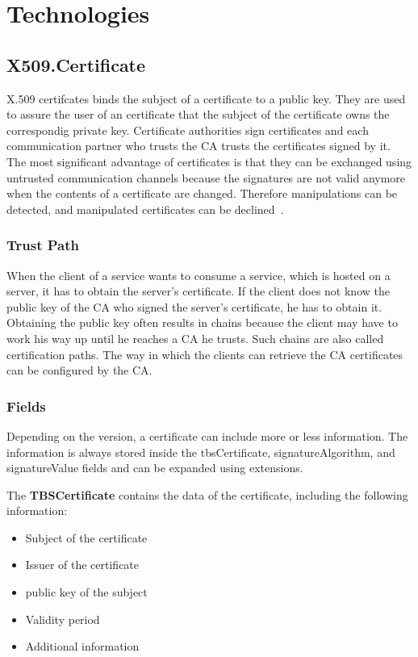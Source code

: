 \section{Technologies}
\subsection{X509.Certificate}
X.509 certifcates binds the subject of a certificate to a public key.
They are used to assure the user of an certificate that the subject of the certificate owns the correspondig private key.
Certificate authorities sign certificates and each communication partner who trusts the CA trusts the certificates signed by it.
The most significant advantage of certificates is that they can be exchanged using untrusted communication channels because the signatures are not valid anymore when the contents of a certificate are changed.
Therefore manipulations can be detected, and manipulated certificates can be declined~\cite{x509rfc}.

\subsubsection{Trust Path}
When the client of a service wants to consume a service, which is hosted on a server, it has to obtain the server's certificate.
If the client does not know the public key of the CA who signed the server's certificate, he has to obtain it.
Obtaining the public key often results in chains because the client may have to work his way up until he reaches a CA he trusts.
Such chains are also called certification paths.
The way in which the clients can retrieve the CA certificates can be configured by the CA.

\subsubsection{Fields}
Depending on the version, a certificate can include more or less information.
The information is always stored inside the tbsCertificate, signatureAlgorithm, and signatureValue fields and can be expanded using extensions.

The \textbf{TBSCertificate} contains the data of the certificate, including the following information:
\begin{itemize}
    \item Subject of the certificate
    \item Issuer of the certificate
    \item public key of the subject
    \item Validity period
    \item Additional information
\end{itemize}

